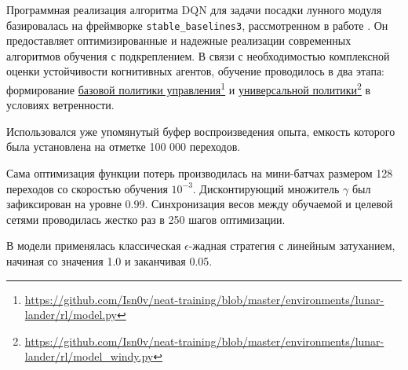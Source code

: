 Программная реализация алгоритма DQN для задачи посадки лунного модуля базировалась на фреймворке \texttt{stable\_baselines3}, рассмотренном в работе \cite{stable_baselines3}. Он предоставляет оптимизированные и надежные реализации современных алгоритмов обучения с подкреплением. В связи с необходимостью комплексной оценки устойчивости когнитивных агентов, обучение проводилось в два этапа: формирование \href{https://github.com/Isn0v/neat-training/blob/master/environments/lunar-lander/rl/model.py}{базовой политики управления}\footnote{\url{https://github.com/Isn0v/neat-training/blob/master/environments/lunar-lander/rl/model.py}} и \href{https://github.com/Isn0v/neat-training/blob/master/environments/lunar-lander/rl/model_windy.py}{универсальной политики}\footnote{\url{https://github.com/Isn0v/neat-training/blob/master/environments/lunar-lander/rl/model_windy.py}} в условиях ветренности.

Использовался уже упомянутый буфер воспроизведения опыта, емкость которого была установлена на отметке 100 000 переходов.

Сама оптимизация функции потерь производилась на мини-батчах размером 128 переходов со скоростью обучения $10^{-3}$. Дисконтирующий множитель $\gamma$ был зафиксирован на уровне 0.99. Синхронизация весов между обучаемой и целевой сетями проводилась жестко раз в 250 шагов оптимизации. 

В модели применялась классическая $\epsilon$-жадная стратегия с линейным затуханием, начиная со значения 1.0 и заканчивая 0.05.
